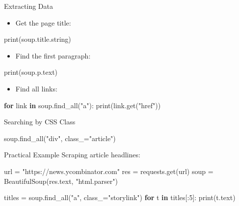 \documentclass[
  letterpaper,
  DIV=11,
  numbers=noendperiod]{scrreprt}
\newenvironment{Shaded}{\begin{snugshade}}{\end{snugshade}}
\newcommand{\BuiltInTok}[1]{\textcolor[rgb]{0.00,0.23,0.31}{#1}}
\newcommand{\ControlFlowTok}[1]{\textcolor[rgb]{0.00,0.23,0.31}{\textbf{#1}}}
\newcommand{\DecValTok}[1]{\textcolor[rgb]{0.68,0.00,0.00}{#1}}
\newcommand{\KeywordTok}[1]{\textcolor[rgb]{0.00,0.23,0.31}{\textbf{#1}}}
\newcommand{\NormalTok}[1]{\textcolor[rgb]{0.00,0.23,0.31}{#1}}
\newcommand{\OperatorTok}[1]{\textcolor[rgb]{0.37,0.37,0.37}{#1}}
\newcommand{\StringTok}[1]{\textcolor[rgb]{0.13,0.47,0.30}{#1}}
\providecommand{\tightlist}{%
  \setlength{\itemsep}{0pt}\setlength{\parskip}{0pt}}
\begin{document}
Extracting Data

\begin{itemize}
\tightlist
\item
  Get the page title:
\end{itemize}

\begin{Shaded}
\begin{Highlighting}[]
\BuiltInTok{print}\NormalTok{(soup.title.string)}
\end{Highlighting}
\end{Shaded}

\begin{itemize}
\tightlist
\item
  Find the first paragraph:
\end{itemize}

\begin{Shaded}
\begin{Highlighting}[]
\BuiltInTok{print}\NormalTok{(soup.p.text)}
\end{Highlighting}
\end{Shaded}

\begin{itemize}
\tightlist
\item
  Find all links:
\end{itemize}

\begin{Shaded}
\begin{Highlighting}[]
\ControlFlowTok{for}\NormalTok{ link }\KeywordTok{in}\NormalTok{ soup.find\_all(}\StringTok{"a"}\NormalTok{):}
    \BuiltInTok{print}\NormalTok{(link.get(}\StringTok{"href"}\NormalTok{))}
\end{Highlighting}
\end{Shaded}

Searching by CSS Class

\begin{Shaded}
\begin{Highlighting}[]
\NormalTok{soup.find\_all(}\StringTok{"div"}\NormalTok{, class\_}\OperatorTok{=}\StringTok{"article"}\NormalTok{)}
\end{Highlighting}
\end{Shaded}

Practical Example Scraping article headlines:

\begin{Shaded}
\begin{Highlighting}[]
\NormalTok{url }\OperatorTok{=} \StringTok{"https://news.ycombinator.com"}
\NormalTok{res }\OperatorTok{=}\NormalTok{ requests.get(url)}
\NormalTok{soup }\OperatorTok{=}\NormalTok{ BeautifulSoup(res.text, }\StringTok{"html.parser"}\NormalTok{)}

\NormalTok{titles }\OperatorTok{=}\NormalTok{ soup.find\_all(}\StringTok{"a"}\NormalTok{, class\_}\OperatorTok{=}\StringTok{"storylink"}\NormalTok{)}
\ControlFlowTok{for}\NormalTok{ t }\KeywordTok{in}\NormalTok{ titles[:}\DecValTok{5}\NormalTok{]:}
    \BuiltInTok{print}\NormalTok{(t.text)}
\end{Highlighting}
\end{Shaded}
\end{document}
